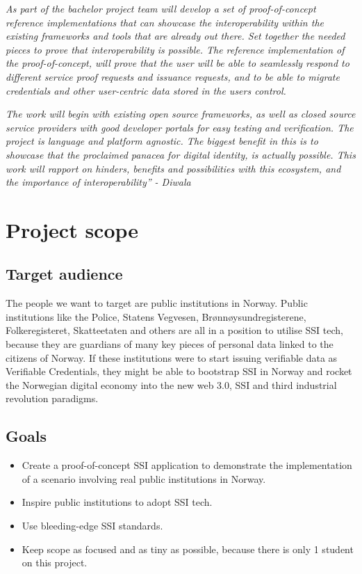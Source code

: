 \emph{As part of the bachelor project team will develop a set of
proof-of-concept reference implementations that can showcase the
interoperability within the existing frameworks and tools that are
already out there. Set together the needed pieces to prove that
interoperability is possible. The reference implementation of the
proof-of-concept, will prove that the user will be able to seamlessly
respond to different service proof requests and issuance requests, and
to be able to migrate credentials and other user-centric data stored in
the users control.}

\emph{The work will begin with existing open source frameworks, as well
as closed source service providers with good developer portals for easy
testing and verification. The project is language and platform agnostic.
The biggest benefit in this is to showcase that the proclaimed panacea
for digital identity, is actually possible. This work will rapport on
hinders, benefits and possibilities with this ecosystem, and the
importance of interoperability'' - Diwala}

\hypertarget{project-scope}{%
\section{Project scope}\label{project-scope}}

\hypertarget{target-audience}{%
\subsection{Target audience}\label{target-audience}}

The people we want to target are public institutions in Norway. Public
institutions like the Police, Statens Vegvesen, Brønnøysundregisterene,
Folkeregisteret, Skatteetaten and others are all in a position to
utilise SSI tech, because they are guardians of many key pieces of
personal data linked to the citizens of Norway. If these institutions
were to start issuing verifiable data as Verifiable Credentials, they
might be able to bootstrap SSI in Norway and rocket the Norwegian
digital economy into the new web 3.0, SSI and third industrial
revolution paradigms.

\hypertarget{goals}{%
\subsection{Goals}\label{goals}}

\begin{itemize}
\tightlist
\item
  Create a proof-of-concept SSI application to demonstrate the
  implementation of a scenario involving real public institutions in
  Norway.
\item
  Inspire public institutions to adopt SSI tech.
\item
  Use bleeding-edge SSI standards.
\item
  Keep scope as focused and as tiny as possible, because there is only 1
  student on this project.
\end{itemize}

